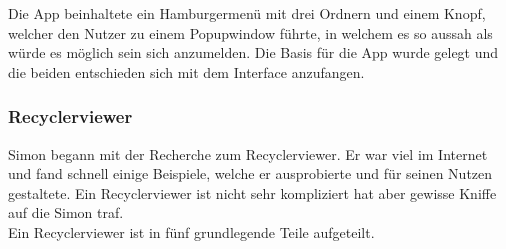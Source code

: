 \documentclass[a4paper,11pt]{article}
\begin{document}
Die App beinhaltete ein Hamburgermenü mit drei Ordnern und einem Knopf, welcher den Nutzer zu einem Popupwindow führte, in welchem es so aussah als würde es möglich sein sich anzumelden.  
Die Basis für die App wurde gelegt und die beiden entschieden sich mit dem Interface anzufangen.

\subsubsection{Recyclerviewer}

Simon begann mit der Recherche zum Recyclerviewer. Er war viel im Internet und fand schnell
einige Beispiele, welche er ausprobierte und für seinen Nutzen gestaltete. Ein Recyclerviewer ist nicht sehr kompliziert
hat aber gewisse Kniffe auf die Simon traf. \\

Ein Recyclerviewer ist in fünf grundlegende Teile aufgeteilt. 
\end{document}
